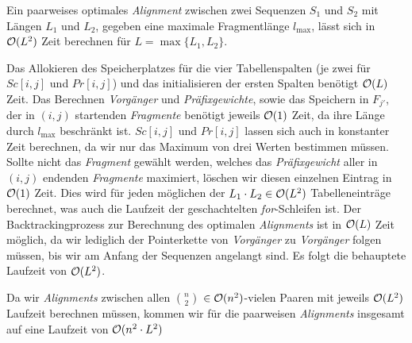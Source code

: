 \begin{satz}
	Ein paarweises optimales \emph{Alignment} zwischen zwei Sequenzen $S_1$ und $S_2$ mit Längen $L_1$ und $L_2$, gegeben eine maximale Fragmentlänge $l_{\max}$, lässt sich in $\mathcal{O}(L^2)$ Zeit berechnen für $L = \max\{L_1, L_2\}$.
\end{satz}

\begin{beweis}
	Das Allokieren des Speicherplatzes für die vier Tabellenspalten (je zwei für $Sc[i,j]$ und $Pr[i,j]$) und das initialisieren der ersten Spalten benötigt $\mathcal{O}(L)$ Zeit. Das Berechnen \emph{Vorgänger} und \emph{Präfixgewichte}, sowie das Speichern in $F_{j'}$, der in $(i,j)$ startenden \emph{Fragmente} benötigt jeweils $\mathcal{O}(1)$ Zeit, da ihre Länge durch $l_{\max}$ beschränkt ist. $Sc[i,j]$ und $Pr[i,j]$ lassen sich auch in konstanter Zeit berechnen, da wir nur das Maximum von drei Werten bestimmen müssen. Sollte nicht das \emph{Fragment} gewählt werden, welches das \emph{Präfixgewicht} aller in $(i,j)$ endenden \emph{Fragmente} maximiert, löschen wir diesen einzelnen Eintrag in $\mathcal{O}(1)$ Zeit. Dies wird für jeden möglichen der $L_1 \cdot L_2 \in \mathcal{O}(L^2)$ Tabelleneinträge berechnet, was auch die Laufzeit der geschachtelten \emph{for}-Schleifen ist.
	Der Backtrackingprozess zur Berechnung des optimalen \emph{Alignments} ist in $\mathcal{O}(L)$ Zeit möglich, da wir lediglich der Pointerkette von \emph{Vorgänger} zu \emph{Vorgänger} folgen müssen, bis wir am Anfang der Sequenzen angelangt sind.
	Es folgt die behauptete Laufzeit von $\mathcal{O}(L^2)$.
\end{beweis}

Da wir \emph{Alignments} zwischen allen ${n}\choose{2}$ $\in \mathcal{O}(n^2)$-vielen Paaren mit jeweils $\mathcal{O}(L^2)$ Laufzeit berechnen müssen, kommen wir für die paarweisen \emph{Alignments} insgesamt auf eine Laufzeit von $\mathcal{O}(n^2\cdot L^2)$


